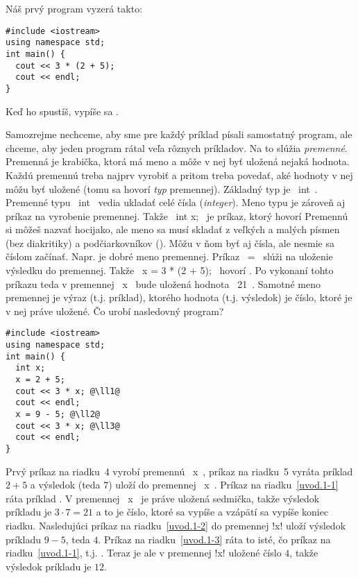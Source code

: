 Náš prvý program vyzerá takto:

\begin{lstlisting}
#include <iostream>
using namespace std;
int main() {
  cout << 3 * (2 + 5);
  cout << endl;
}
\end{lstlisting}

Keď ho spustíš, vypíše sa .

Samozrejme nechceme, aby sme pre každý príklad písali samostatný program, ale chceme,
aby jeden program rátal veľa rôznych príkladov. Na to slúžia {\em premenné}. Premenná
je krabička, ktorá má meno a môže v nej byť uložená nejaká hodnota. Každú premennú treba
najprv vyrobiť a pritom treba povedať, aké hodnoty v nej môžu byť uložené (tomu sa hovorí
{\em typ} premennej). Základný typ je \prg~int~. Premenné typu \prg~int~ vedia ukladať celé 
čísla ({\em integer}). Meno typu je zároveň aj príkaz na vyrobenie premennej.
Takže \prg~int x;~ je príkaz, ktorý hovorí  Premennú si môžeš nazvať hocijako, ale
meno sa musí skladať z veľkých a malých písmen (bez diakritiky) a podčiarkovníkov (\vb{\_}).
Môžu v ňom byť aj čísla, ale nesmie sa číslom začínať. Napr.  je
dobré meno premennej. Príkaz \prg~=~ slúži na uloženie
výsledku do premennej. Takže \prg~x = 3 * (2 + 5);~ hovorí . Po vykonaní tohto príkazu
teda v premennej \prg~x~ bude uložená hodnota \prg~21~. Samotné meno premennej
je výraz (t.j. príklad), ktorého hodnota (t.j. výsledok) je číslo, 
ktoré je v nej práve uložené. Čo urobí nasledovný program?

\begin{lstlisting}[label=uvod.1]
#include <iostream>
using namespace std;
int main() {
  int x;
  x = 2 + 5;
  cout << 3 * x; @\ll1@
  cout << endl;
  x = 9 - 5; @\ll2@
  cout << 3 * x; @\ll3@
  cout << endl;
}
\end{lstlisting}

Prvý príkaz na riadku~4 vyrobí premennú \prg~x~, príkaz na riadku~5
vyráta príklad $2+5$ a výsledok (teda $7$)
uloží do premennej \prg~x~. Príkaz na riadku~\ref{uvod.1-1} ráta príklad 
. V premennej \prg~x~ je práve uložená sedmička, takže výsledok príkladu je 
$3\cdot7=21$ a to je číslo, ktoré sa vypíše a vzápätí sa vypíše koniec riadku.
Nasledujúci príkaz na riadku~\ref{uvod.1-2} do premennej \prg!x! uloží výsledok príkladu $9-5$, teda $4$. 
Príkaz na riadku~\ref{uvod.1-3} ráta to isté, čo príkaz na riadku~\ref{uvod.1-1}, t.j.
. Teraz je ale v premennej \prg!x! uložené
číslo $4$, takže výsledok príkladu je $12$.


